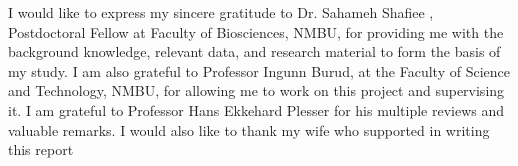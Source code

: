 \documentclass[sigconf, nonacm, natbib, screen, balance=False]{acmart}
\begin{document}
\begin{acks}
I would like to express my sincere gratitude to Dr. Sahameh Shafiee , Postdoctoral Fellow at Faculty of Biosciences, NMBU, for providing me with the background knowledge, relevant data, and research material to form the basis of my study. I am also grateful to Professor Ingunn Burud, at the Faculty of Science and Technology, NMBU, for allowing me to work on this project and supervising it. I am grateful to Professor Hans Ekkehard Plesser for his multiple reviews and valuable remarks. I would also like to thank my wife who supported in writing this report

\end{acks}




\end{document}
